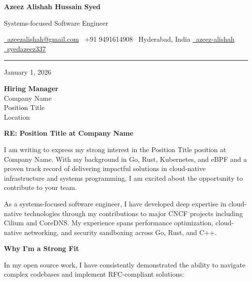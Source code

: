 \documentclass[10pt,letterpaper]{article}
\newcommand{\HiringManager}{Hiring Manager}
\newcommand{\CompanyName}{Company Name}
\newcommand{\PositionTitle}{Position Title}
\newcommand{\JobLocation}{Location}
\newcommand{\CoverLetterDate}{January 1, 2026}
\begin{document}
\begin{center}
    {\LARGE\bfseries\color{primary}Azeez Alishah Hussain Syed}

    \vspace{2pt}
    {\color{secondary}Systems-focused Software Engineer}

    \vspace{6pt}
    {\small
    \href{mailto:azeezalishah@gmail.com}{\faEnvelope\ azeezalishah@gmail.com} \quad
    \faPhone\ +91 9491614908 \quad
    \faMapMarker*\ Hyderabad, India \quad
    \href{https://linkedin.com/in/azeez-alishah}{\faLinkedin\ azeez-alishah} \quad
    \href{https://github.com/syedazeez337}{\faGithub\ syedazeez337}
    }
\end{center}

\vspace{4pt}
\hrule
\vspace{8pt}

\noindent
\begin{minipage}[t]{0.5\textwidth}
{\color{secondary}\CoverLetterDate}
\end{minipage}%
\begin{minipage}[t]{0.5\textwidth}
\raggedleft
\textbf{\HiringManager}\\
\CompanyName\\
\PositionTitle\\
\JobLocation
\end{minipage}

\vspace{12pt}

\textbf{RE: \PositionTitle{} at \CompanyName}

\vspace{6pt}

I am writing to express my strong interest in the \PositionTitle{} position at \CompanyName. With my background in Go, Rust, Kubernetes, and eBPF and a proven track record of delivering impactful solutions in cloud-native infrastructure and systems programming, I am excited about the opportunity to contribute to your team.

As a systems-focused software engineer, I have developed deep expertise in cloud-native technologies through my contributions to major CNCF projects including Cilium and CoreDNS. My experience spans performance optimization, cloud-native networking, and security sandboxing across Go, Rust, and C++.

\textbf{Why I'm a Strong Fit}

In my open source work, I have consistently demonstrated the ability to navigate complex codebases and implement RFC-compliant solutions:
\end{document}
